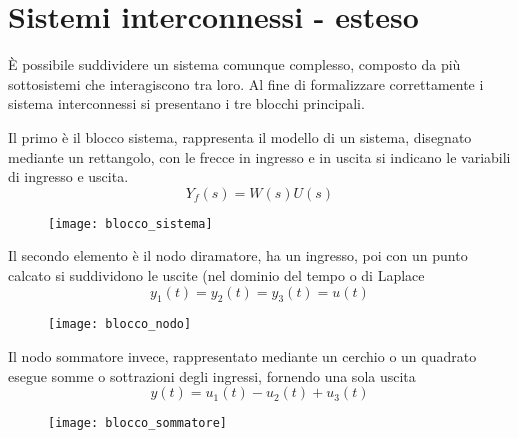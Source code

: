 
\section{Sistemi interconnessi - esteso}
È possibile suddividere un sistema comunque complesso, composto da più
sottosistemi che interagiscono tra loro.
Al fine di formalizzare correttamente i sistema interconnessi si presentano i
tre blocchi principali.

Il primo è il blocco sistema, rappresenta il modello di un sistema, disegnato
mediante un rettangolo, con le frecce in ingresso e in uscita si indicano le
variabili di ingresso e uscita.
$$
Y_f(s) = W(s)U(s)
$$
\begin{figure}[h]
\centering
\texttt{[image: blocco\_sistema]}
\end{figure}

Il secondo elemento è il nodo diramatore, ha un ingresso, poi con un punto
calcato si suddividono le uscite (nel dominio del tempo o di Laplace
$$
y_1(t) = y_2(t) = y_3(t) = u(t)
$$
\begin{figure}[h]
\centering
\texttt{[image: blocco\_nodo]}
\end{figure}

\newpage
Il nodo sommatore invece, rappresentato mediante un cerchio o un quadrato
esegue somme o sottrazioni degli ingressi, fornendo una sola uscita
$$
y(t) = u_1(t) - u_2(t) + u_3(t)
$$
\begin{figure}[h]
 \centering
 \texttt{[image: blocco\_sommatore]}
\end{figure}
